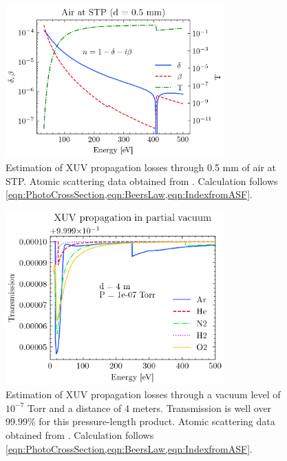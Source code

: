 \begin{figure}
	\centering
	\includegraphics[width=0.75\textwidth]{figures/chap2/AirAbs.png}
	\caption{Estimation of XUV propagation losses through 0.5 mm of air at STP. Atomic scattering data obtained from \cite{gulliksonCXROXRayInteractions,henkeXRayInteractionsPhotoabsorption1993}. Calculation follows \cref{eqn:PhotoCrossSection,eqn:BeersLaw,eqn:IndexfromASF}.}
	\label{fig:AirAbs}
\end{figure}

\begin{figure}
	\centering
	\includegraphics[width=0.75\textwidth]{figures/chap2/XUVinVacuum.png}
	\caption{Estimation of XUV propagation losses through a vacuum level of $10^{-7}$ Torr and a distance of 4 meters. Transmission is well over 99.99\% for this pressure-length product. Atomic scattering data obtained from \cite{gulliksonCXROXRayInteractions,henkeXRayInteractionsPhotoabsorption1993}. Calculation follows \cref{eqn:PhotoCrossSection,eqn:BeersLaw,eqn:IndexfromASF}.}
	\label{fig:XUVinVacuum}
\end{figure}

